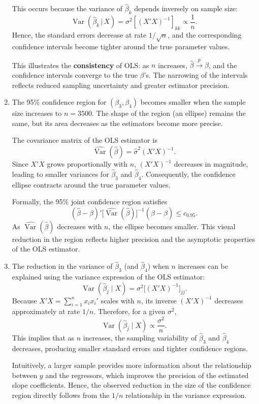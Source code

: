 \begin{enumerate}[label=(\roman*)]
\medskip
\noindent
This occurs because the variance of $\hat{\beta}_k$ depends inversely on sample size:
\[
\operatorname{Var}(\hat{\beta}_k \,|\, X) = \sigma^2 [(X'X)^{-1}]_{kk} \propto \frac{1}{n}.
\]
Hence, the standard errors decrease at rate $1/\sqrt{n}$, 
and the corresponding confidence intervals become tighter around the true parameter values.  

\medskip
\noindent
This illustrates the \textbf{consistency} of OLS: as $n$ increases, $\hat{\beta} \xrightarrow{p} \beta$, 
and the confidence intervals converge to the true $\beta$’s.  
The narrowing of the intervals reflects reduced sampling uncertainty and greater estimator precision.

\item

The 95\% confidence region for $(\beta_3, \beta_4)$ becomes smaller when the sample size increases to $n = 3500$.  
The shape of the region (an ellipse) remains the same, but its area decreases as the estimators become more precise.  

\medskip
\noindent
The covariance matrix of the OLS estimator is
\[
\widehat{\operatorname{Var}}(\hat{\beta}) = \hat{\sigma}^2 (X'X)^{-1}.
\]
Since $X'X$ grows proportionally with $n$, $(X'X)^{-1}$ decreases in magnitude, 
leading to smaller variances for $\hat{\beta}_3$ and $\hat{\beta}_4$.  
Consequently, the confidence ellipse contracts around the true parameter values.

\medskip
\noindent
Formally, the 95\% joint confidence region satisfies
\[
(\hat{\beta} - \beta)' 
\big[\widehat{\operatorname{Var}}(\hat{\beta})\big]^{-1} 
(\hat{\beta} - \beta) \leq c_{0.95}.
\]
As $\widehat{\operatorname{Var}}(\hat{\beta})$ decreases with $n$, 
the ellipse becomes smaller.  
This visual reduction in the region reflects higher precision and the asymptotic properties of the OLS estimator.

\item

The reduction in the variance of $\hat{\beta}_3$ (and $\hat{\beta}_4$) when $n$ increases 
can be explained using the variance expression of the OLS estimator:
\[
\operatorname{Var}(\hat{\beta}_j \mid X) = \sigma^2 \big[(X'X)^{-1}\big]_{jj}.
\]
Because $X'X = \sum_{i=1}^n x_i x_i'$ scales with $n$, 
its inverse $(X'X)^{-1}$ decreases approximately at rate $1/n$.  
Therefore, for a given $\sigma^2$,
\[
\operatorname{Var}(\hat{\beta}_j \mid X) \propto \frac{\sigma^2}{n}.
\]
This implies that as $n$ increases, the sampling variability of $\hat{\beta}_3$ and $\hat{\beta}_4$ decreases, 
producing smaller standard errors and tighter confidence regions.

\medskip
\noindent
Intuitively, a larger sample provides more information about the relationship between $y$ and the regressors, 
which improves the precision of the estimated slope coefficients.  
Hence, the observed reduction in the size of the confidence region directly follows from the 
$1/n$ relationship in the variance expression.



\end{enumerate}